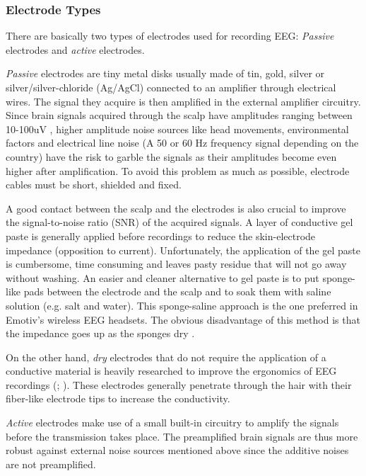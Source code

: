 \documentclass[12pt]{article}
\newcommand\mysubsubsection[1]{\subsubsection{#1}}
\numberwithin{equation}{section}
\numberwithin{figure}{section}
\numberwithin{table}{section}
\begin{document}
\mysubsubsection{Electrode Types}
\par{
    There are basically two types of electrodes used for recording EEG: \emph{Passive} electrodes and
    \emph{active} electrodes.
}
\par{
    \emph{Passive} electrodes are tiny metal disks usually made of tin, gold, silver
    or silver/silver-chloride (Ag/AgCl) connected to an amplifier
    through electrical wires. The signal they acquire is then amplified in the
    external amplifier circuitry. Since brain signals acquired through the scalp
    have amplitudes ranging between 10-100uV \citep{sanei_eeg_2008}, higher amplitude noise sources like
    head movements, environmental factors and electrical line noise (A 50 or 60 Hz
    frequency signal depending on the country) have the risk to garble the signals as their
    amplitudes become even higher after amplification. To avoid this problem as much as
    possible, electrode cables must be short, shielded and fixed.
}
\par{
    A good contact between the scalp and the electrodes is also crucial to
    improve the signal-to-noise ratio (SNR) of the acquired signals. A layer of conductive
    gel paste is generally applied before recordings to reduce the skin-electrode impedance (opposition to current).
    Unfortunately, the application of the gel paste is cumbersome, time consuming and
    leaves pasty residue that will not go away without washing. An easier and
    cleaner alternative to gel paste is to put sponge-like pads between the
    electrode and the scalp and to soak them with saline solution (e.g. salt and water).
    This sponge-saline approach is the one preferred in Emotiv's wireless
    EEG headsets. The obvious disadvantage of this method is that the impedance
    goes up as the sponges dry \citep{wolpaw_brain-computer_2012}.
}
\par{
    On the other hand, \emph{dry} electrodes
    that do not require the application of a conductive material is heavily
    researched to improve the ergonomics of EEG recordings (\citealp{popescu_single_2007}; \citealp{grozea_bristle-sensorslow-cost_2011}).
    These electrodes generally penetrate through the hair
    with their fiber-like electrode tips to increase the conductivity.
}
\par{
    \emph{Active} electrodes make use of a small built-in circuitry to amplify
    the signals before the transmission takes place. The preamplified brain signals
    are thus more robust against external noise sources mentioned above since
    the additive noises are not preamplified.
}
\end{document}
